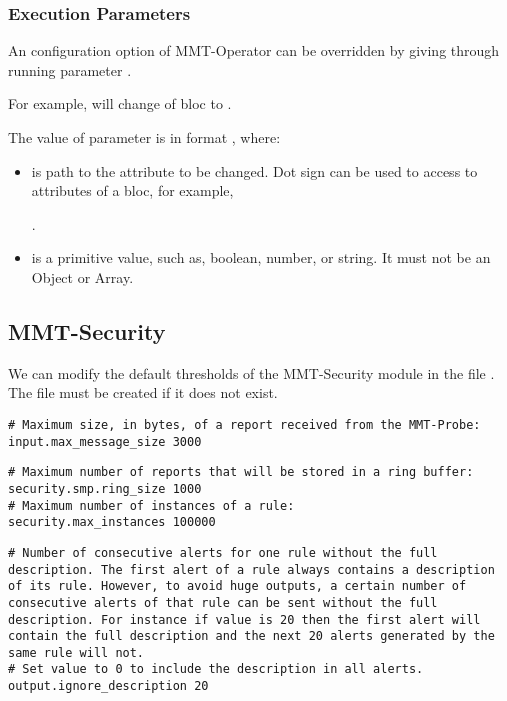 \subsubsection{Execution Parameters}
An configuration option of MMT-Operator can be overridden by giving through running parameter .

For example,  will change  of
 bloc to .

The value of  parameter is in format , where:

\begin{itemize}
   \item {} is path to the attribute to be changed. Dot sign can be used to access to attributes of a bloc, for example,
   
   .
   
   \item {} is a primitive value, such as, boolean, number, or string. It must not be an Object or Array.
\end{itemize}

\subsection{MMT-Security}
We can modify the default thresholds of the MMT-Security module in  the file . The file must be created if it does not exist.

\begin{lstlisting}[style=CONFIG]
# Maximum size, in bytes, of a report received from the MMT-Probe:
input.max_message_size 3000
\end{lstlisting}

\begin{lstlisting}[style=CONFIG]
# Maximum number of reports that will be stored in a ring buffer:
security.smp.ring_size 1000
# Maximum number of instances of a rule:
security.max_instances 100000
\end{lstlisting}

\begin{lstlisting}[style=CONFIG]
# Number of consecutive alerts for one rule without the full description. The first alert of a rule always contains a description of its rule. However, to avoid huge outputs, a certain number of consecutive alerts of that rule can be sent without the full description. For instance if value is 20 then the first alert will contain the full description and the next 20 alerts generated by the same rule will not.
# Set value to 0 to include the description in all alerts.
output.ignore_description 20
\end{lstlisting}
